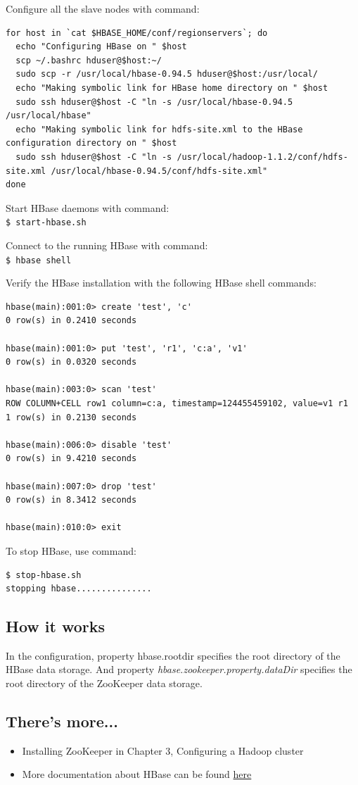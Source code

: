 Configure all the slave nodes with command:
\begin{verbatim}
for host in `cat $HBASE_HOME/conf/regionservers`; do
  echo "Configuring HBase on " $host
  scp ~/.bashrc hduser@$host:~/
  sudo scp -r /usr/local/hbase-0.94.5 hduser@$host:/usr/local/
  echo "Making symbolic link for HBase home directory on " $host
  sudo ssh hduser@$host -C "ln -s /usr/local/hbase-0.94.5 /usr/local/hbase"
  echo "Making symbolic link for hdfs-site.xml to the HBase configuration directory on " $host
  sudo ssh hduser@$host -C "ln -s /usr/local/hadoop-1.1.2/conf/hdfs-site.xml /usr/local/hbase-0.94.5/conf/hdfs-site.xml"
done
\end{verbatim}

Start HBase daemons with command: \\
\verb|$ start-hbase.sh|

Connect to the running HBase with command: \\
\verb|$ hbase shell|

Verify the HBase installation with the following HBase shell commands: 
\begin{verbatim}
hbase(main):001:0> create 'test', 'c'
0 row(s) in 0.2410 seconds

hbase(main):001:0> put 'test', 'r1', 'c:a', 'v1'
0 row(s) in 0.0320 seconds

hbase(main):003:0> scan 'test'
ROW COLUMN+CELL row1 column=c:a, timestamp=124455459102, value=v1 r1
1 row(s) in 0.2130 seconds

hbase(main):006:0> disable 'test'
0 row(s) in 9.4210 seconds

hbase(main):007:0> drop 'test'
0 row(s) in 8.3412 seconds

hbase(main):010:0> exit
\end{verbatim}

To stop HBase, use command:
\begin{verbatim}
$ stop-hbase.sh
stopping hbase...............
\end{verbatim}

\subsection*{How it works}
In the configuration, property hbase.rootdir specifies the root directory of the HBase data storage. And property \emph{hbase.zookeeper.property.dataDir} specifies the root directory of the ZooKeeper data storage.

\subsection*{There's more...}
\begin{itemize}
  \item Installing ZooKeeper in Chapter 3, Configuring a Hadoop cluster
  \item More documentation about HBase can be found \href{http://wiki.apache.org/hadoop/Hbase}{here}
\end{itemize}

